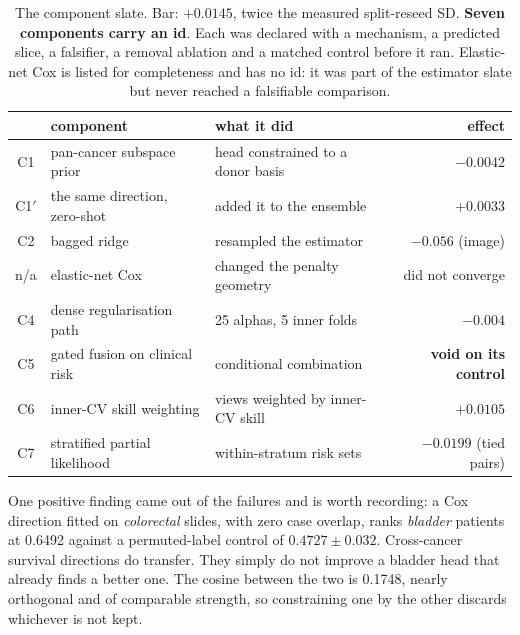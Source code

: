 \documentclass[11pt]{article}
\begin{document}
\begin{table}[t]
\centering
\caption{The component slate. Bar: $+0.0145$, twice the measured split-reseed SD. \textbf{Seven
components carry an id}. Each was declared with a mechanism, a predicted slice, a falsifier, a
removal ablation and a matched control before it ran. Elastic-net Cox is listed for completeness and
has no id: it was part of the estimator slate but never reached a falsifiable comparison.}
\label{tab:components}
{\small
\begin{tabular}{cllr}
\toprule
 & component & what it did & effect \\
\midrule
C1  & pan-cancer subspace prior        & head constrained to a donor basis & $-0.0042$ \\
C1$'$ & the same direction, zero-shot    & added it to the ensemble & $+0.0033$ \\
C2  & bagged ridge                       & resampled the estimator      & $-0.056$ (image) \\
n/a & elastic-net Cox                    & changed the penalty geometry & did not converge \\
C4  & dense regularisation path          & 25 alphas, 5 inner folds     & $-0.004$ \\
C5  & gated fusion on clinical risk      & conditional combination      & \textbf{void on its control} \\
C6  & inner-CV skill weighting           & views weighted by inner-CV skill & $+0.0105$ \\
C7  & stratified partial likelihood      & within-stratum risk sets     & $-0.0199$ (tied pairs) \\
\bottomrule
\end{tabular}}
\end{table}

One positive finding came out of the failures and is worth recording: a Cox direction fitted on
\emph{colorectal} slides, with zero case overlap, ranks \emph{bladder} patients at 0.6492 against a
permuted-label control of $0.4727 \pm 0.032$. Cross-cancer survival directions do transfer. They
simply do not improve a bladder head that already finds a better one. The cosine between the two
is 0.1748, nearly orthogonal and of comparable strength, so constraining one by the other discards
whichever is not kept.
\end{document}
